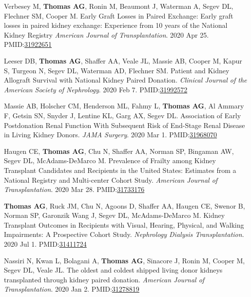 \documentclass[10pt]{article}
\makeatletter
\newlength{\bibhang}
\newlength{\bibsep}
 {\@listi \global\bibsep\itemsep \global\advance\bibsep by\parsep}
\newenvironment{bibenum*}
  {\renewcommand\labelenumi{[\theenumi]}%
   \etaremune[
     topsep=0pt,
     itemsep=\bibsep,
     parsep=0pt,partopsep=0pt,
     itemindent=-\bibhang,
     leftmargin={\bibhang+\widthof{[999]}}]}
  {\endetaremune}
\newcommand{\pmid}[1]{PMID:\href{https://www.ncbi.nlm.nih.gov/pubmed/#1}{#1}}
\makeatother
\begin{document}
\begin{bibenum*}
\item Verbesey M, \textbf{Thomas AG}, Ronin M, Beaumont J, Waterman A,
  Segev DL, Flechner SM, Cooper M. Early Graft Losses in Paired Exchange:
  Early graft losses in paired kidney exchange: Experience from 
  10 years of the National Kidney Registry 
  \emph{American Journal of Transplantation}. 2020 Apr 25.
  \pmid{31922651} 

\item Leeser DB, \textbf{Thomas AG}, Shaffer AA, Veale JL,
  Massie AB, Cooper M,
  Kapur S, Turgeon N, Segev DL, Waterman AD, Flechner SM.
  Patient and Kidney Allograft Survival with National Kidney Paired Donation.
  \emph{Clinical Journal of the American Society of Nephrology}. 2020 Feb 7.
  \pmid{31992572} 

\item Massie AB, Holscher CM, Henderson ML, Fahmy L, \textbf{Thomas AG},
  Al Ammary F, Getsin SN, Snyder J, Lentine KL, Garg AX, Segev DL.
  Association of Early Postdonation Renal Function With Subsequent 
  Risk of End-Stage Renal Disease in Living Kidney Donors.
 \emph{JAMA Surgery}. 2020 Mar 1.
 \pmid{31968070} 

\item Haugen CE\dag, \textbf{Thomas AG\dag}, Chu N, Shaffer AA, Norman SP,
  Bingaman AW, Segev DL, McAdams-DeMarco M.
  Prevalence of Frailty among Kidney Transplant Candidates and Recipients
  in the United States: Estimates from a National Registry and Multi-center
  Cohort Study.
  \emph{American Journal of Transplantation}. 2020 Mar 28.
  \pmid{31733176} 

\item \textbf{Thomas AG}, Ruck JM, Chu N, Agoons D, Shaffer AA, Haugen CE,
  Swenor B, Norman SP, Garonzik Wang J, Segev DL, McAdams-DeMarco M.
  Kidney Transplant Outcomes in Recipients with Visual, Hearing,
  Physical, and Walking Impairments: A Prospective Cohort Study.
  \emph{Nephrology Dialysis Transplantation}. 2020 Jul 1.
  \pmid{31411724} 

\item Nassiri N, Kwan L, Bolagani A, \textbf{Thomas AG}, Sinacore J, Ronin M,
  Cooper M, Segev DL, Veale JL.
  The oldest and coldest shipped living donor kidneys transplanted
  through kidney paired donation.
  \emph{American Journal of Transplantation}. 2020 Jan 2.
  \pmid{31278819} 


\end{bibenum*}
\end{document}
